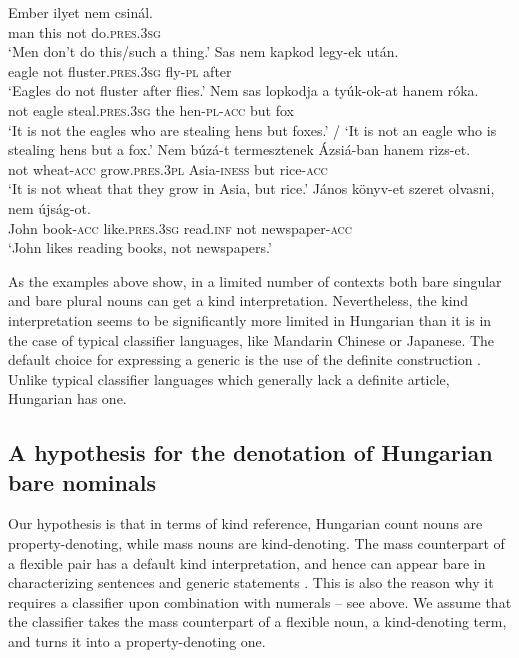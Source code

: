 \documentclass[output=paper]{langscibook}
\begin{document}
\ea \label{schv-nem:ex:45}
\gll Ember ilyet nem csinál.\\
man this not do.\textsc{pres}.\textsc{3sg}\\
\glt `Men don’t do this/such a thing.' \hfill \citep[p. 115, (49a)]{schvarcz-18}
\ex \label{schv-nem:ex:46}
\gll Sas nem kapkod legy-ek után.\\
eagle not fluster.\textsc{pres}.\textsc{3sg} fly-\textsc{pl}  after\\
\glt `Eagles do not fluster after flies.' \hfill \citep[p. 115, (49b)]{schvarcz-18}
\ex \label{schv-nem:ex:47}
\gll Nem sas lopkodja a tyúk-ok-at hanem róka.\\
not eagle steal.\textsc{pres}.\textsc{3sg} the hen-\textsc{pl}-\textsc{acc} but fox\\
\glt `It is not the eagles who are stealing hens but foxes.' / `It is not an eagle who is stealing hens but a fox.' 
\ex \label{schv-nem:ex:48}
\gll Nem búzá-t termesztenek Ázsiá-ban hanem rizs-et.\\
not wheat-\textsc{acc} grow.\textsc{pres}.\textsc{3pl} Asia-\textsc{iness} but rice-\textsc{acc}\\
\glt `It is not wheat that they grow in Asia, but rice.' 
\ex \label{schv-nem:ex:49}
\gll  János könyv-et szeret olvasni, nem újság-ot. \\
John book-\textsc{acc} like.\textsc{pres}.\textsc{3sg} read.\textsc{inf} not newspaper-\textsc{acc}\\
\glt `John likes reading books, not newspapers.' 
\z

\noindent As the examples above show, in a limited number of contexts both bare singular and bare plural nouns can get a kind interpretation. Nevertheless, the kind interpretation seems to be significantly more limited in Hungarian than it is in the case of typical classifier languages, like Mandarin Chinese or Japanese. The default choice for expressing a generic is the use of the definite construction . Unlike typical classifier languages which generally lack a definite article, Hungarian has one.

\subsection{A hypothesis for the denotation of Hungarian bare nominals} \label{schv-nem:sec:4.2}

Our hypothesis is that in terms of kind reference, Hungarian count nouns are property-denoting, while mass nouns are kind-denoting. The mass counterpart of a flexible pair has a default kind interpretation, and hence can appear bare in characterizing sentences  and generic statements . This is also the reason why it requires a classifier upon combination with numerals -- see  above. We assume that the classifier takes the mass counterpart of a flexible noun, a kind-denoting term, and turns it into a property-denoting one. 
\end{document}
